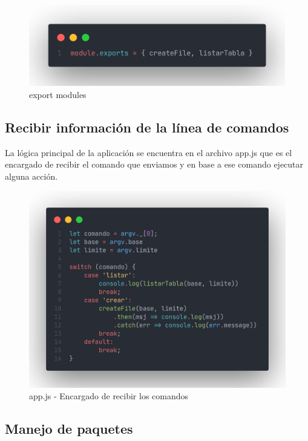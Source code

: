 \documentclass[12pt]{article}
\begin{document}
\begin{figure}[H]
    \centering
    \includegraphics[scale=.25]{assets/images/export.png}
    \caption{export modules}

\end{figure}

\subsection{Recibir información de la línea
    de comandos}

La lógica principal de la aplicación se encuentra en el archivo app.js que es el encargado de recibir el comando que enviamos y en base a ese comando ejecutar alguna acción.

\begin{figure}[H]
    \centering
    \includegraphics[scale=.25]{assets/images/app.png}
    \caption{app.js - Encargado de recibir los comandos}
\end{figure}

\subsection{Manejo de paquetes}
\end{document}
